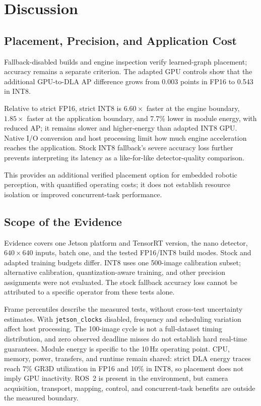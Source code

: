 \section{Discussion}
\label{sec:discussion}
\subsection{Placement, Precision, and Application Cost}
Fallback-disabled builds and engine inspection verify learned-graph placement;
accuracy remains a separate criterion. The adapted GPU controls show that the
additional GPU-to-DLA AP difference grows from 0.003 points in FP16 to 0.543
in INT8.

Relative to strict FP16, strict INT8 is $6.60\times$ faster at the engine
boundary, $1.85\times$ faster at the application boundary, and 7.7\% lower in
module energy, with reduced AP; it remains slower and higher-energy than
adapted INT8 GPU. Native I/O conversion and host
processing limit how much engine acceleration reaches the application.
Stock INT8 fallback's severe accuracy loss further prevents interpreting its
latency as a like-for-like detector-quality comparison.

This provides an additional verified placement option for embedded robotic
perception, with quantified operating costs; it does not establish resource
isolation or improved concurrent-task performance.

\subsection{Scope of the Evidence}
Evidence covers one Jetson platform and TensorRT version, the nano detector,
$640\times640$ inputs, batch one, and the tested FP16/INT8 build modes.
Stock and adapted training budgets differ. INT8 uses one 500-image calibration
subset; alternative calibration, quantization-aware training, and other
precision assignments were not evaluated. The stock fallback accuracy loss
cannot be attributed to a specific operator from these tests alone.

Frame percentiles describe the measured tests, without cross-test uncertainty
estimates. With \texttt{jetson\_clocks} disabled, frequency and scheduling
variation affect host processing. The 100-image cycle is not a full-dataset
timing distribution, and zero observed deadline misses do not establish hard
real-time guarantees. Module energy is specific to the 10\,Hz operating point.
CPU, memory, power, transfers, and runtime remain shared: strict DLA energy
traces reach 7\% GR3D utilization in FP16 and 10\% in INT8, so placement does
not imply GPU inactivity. ROS~2 \cite{macenski2022ros2} is present in the
environment, but camera acquisition, transport, mapping, control, and
concurrent-task benefits are outside the measured boundary.

